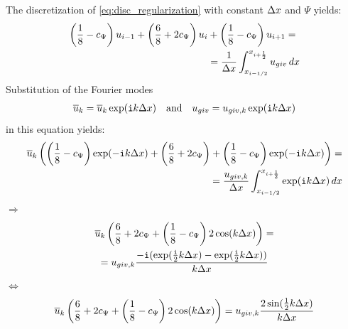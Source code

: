 The discretization of \autoref{eq:disc_regularization} with constant $\Delta x$ and $\Psi$ yields:
\begin{align}
\left( \frac{1}{8}
- c_{\Psi} \right)  u_{i-1}
+ \left( \frac{6}{8} + 2c_{\Psi}\right)  u_i & +
\left(  \frac{1}{8} - c_{\Psi} \right)  u_{i+1}  =
\\
& = \frac{1}{\Delta x}\int_{x_{i-1/2}}^{x_{i+\frac{1}{2}}} u_{giv}\, dx
\end{align}
%
Substitution of the Fourier modes
\begin{align}
\overline{u}_k = \overline{u}_k \exp({\mathtt{i}} k \Delta x)\quad \text{and} \quad  u_{giv} = u_{giv,k} \exp({\mathtt{i}} k \Delta x)
\end{align}
in this equation yields:
\begin{align}
\overline{u}_k  \left(  \left( \frac{1}{8} -  c_{\Psi}\right) \exp(-{\mathtt{i}} k \Delta x) +
\left(\frac{6}{8} + 2c_{\Psi} \right) +
\left( \frac{1}{8} -  c_{\Psi} \right) \exp(-{\mathtt{i}} k \Delta x) \right)  = &
\\
= \frac{u_{giv,k}}{\Delta x} \int_{x_{i-1/2}}^{x_{i+\frac{1}{2}}}  \exp({\mathtt{i}} k \Delta x)\, dx &
\end{align}
$\Rightarrow$
\begin{multline}
\overline{u}_k \left(  \frac{6}{8} + 2c_{\Psi} + \left( \frac{1}{8} -  c_{\Psi} \right)  2 \cos(k\Delta x) \right)
=
\\
= u_{giv,k} \frac{-{\mathtt{i}} (\exp(\frac{{\mathtt{i}}}{2} k \Delta x) - \exp(\frac{{\mathtt{i}}}{2} k \Delta x) )}{k\Delta x}
\end{multline}
$\Leftrightarrow$
\begin{multline}
\overline u_k \left(  \frac{6}{8} + 2c_{\Psi} + \left( \frac{1}{8} -  c_{\Psi} \right)  2 \cos(k\Delta x) \right)
= u_{giv,k} \frac{2 \sin(\frac{1}{2} k \Delta x)}{k\Delta x}
\label{eq:regularize_piecewise_linear}
\end{multline}

